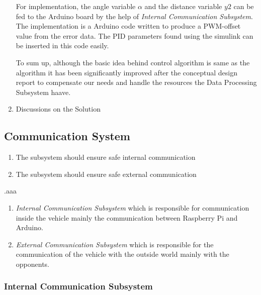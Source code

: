 \documentclass[a4paper,12pt]{article}
\begin{document}
\begin{enumerate}
	For implementation, the angle variable $\alpha$ and the distance variable $y2$ can be fed to the Arduino board by the help of \textit{Internal Communication Subsystem}. The implementation is a Arduino code written to produce a PWM-offset value from the error data. The PID parameters found using the simulink can be inserted in this code easily.
		
	To sum up, although the basic idea behind control algorithm is same as the algorithm it has been significantly improved after the conceptual design report to compensate our needs and handle the resources the Data Processing Subsystem haave.
				
				
				

				
				\item {Discussions on the Solution}
			
			\end{enumerate}
		
		
			
		
		
			
			
		\subsection{Communication System}
			
			\begin{enumerate}
				\item The subsystem should ensure safe internal communication
				\item The subsystem should ensure safe external communication
			\end{enumerate}	
		
		
		.aaa
			\begin{enumerate}
				\item \textit{Internal Communication Subsystem} which is responsible for communication inside the vehicle mainly the communication between Raspberry Pi and Arduino.						
\item \textit{External Communication Subsystem} which is responsible for the communication of the vehicle with the outside world mainly with the opponents.
			\end{enumerate}		
			
			
		\subsubsection{Internal Communication Subsystem}
		
\end{document}
